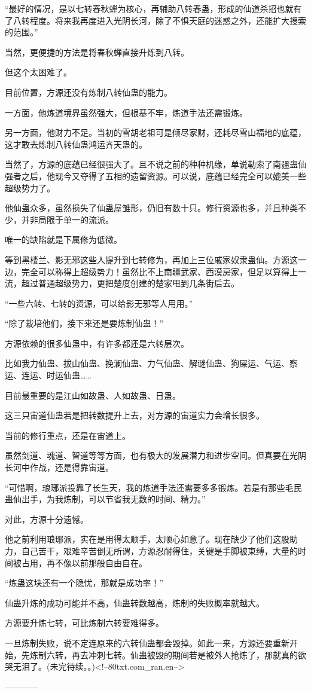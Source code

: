 \begin{this_body}
“最好的情况，是以七转春秋蝉为核心，再辅助八转春蛊，形成的仙道杀招也就有了八转程度。将来我再度进入光阴长河，除了不惧天庭的迷惑之外，还能扩大搜索的范围。”

当然，更便捷的方法是将春秋蝉直接升炼到八转。

但这个太困难了。

目前位置，方源还没有炼制八转仙蛊的能力。

一方面，他炼道境界虽然强大，但根基不牢，炼道手法还需锻炼。

另一方面，他财力不足。当初的雪胡老祖可是倾尽家财，还耗尽雪山福地的底蕴，这才敢去炼制八转仙蛊鸿运齐天蛊的。

当然了，方源的底蕴已经很强大了。且不说之前的种种机缘，单说勒索了南疆蛊仙强者之后，他现今又夺得了五相的遗留资源。可以说，底蕴已经完全可以媲美一些超级势力了。

他仙蛊众多，虽然损失了仙蛊屋雏形，仍旧有数十只。修行资源也多，并且种类不少，并非局限于单一的流派。

唯一的缺陷就是下属修为低微。

等到黑楼兰、影无邪这些人提升到七转修为，再加上三位戚家奴隶蛊仙。方源这一边，完全可以称得上超级势力！虽然比不上南疆武家、西漠房家，但足以算得上一流，超过普通超级势力，更把楚度创建的楚家甩到几条街后去。

“一些六转、七转的资源，可以给影无邪等人用用。”

“除了栽培他们，接下来还是要炼制仙蛊！”

方源依赖的很多仙蛊中，有许多都还是六转层次。

比如我力仙蛊、拔山仙蛊、挽澜仙蛊、力气仙蛊、解谜仙蛊、狗屎运、气运、察运、连运、时运仙蛊……

目前最重要的是江山如故蛊、人如故蛊、日蛊。

这三只宙道仙蛊若是把转数提升上去，对方源的宙道实力会增长很多。

当前的修行重点，还是在宙道上。

虽然剑道、魂道、智道等等方面，也有极大的发展潜力和进步空间。但真要在光阴长河中作战，还是得靠宙道。

“可惜啊，琅琊派投靠了长生天，我的炼道手法还需要多多锻炼。若是有那些毛民蛊仙出手，为我炼制，可以节省我无数的时间、精力。”

对此，方源十分遗憾。

他之前利用琅琊派，实在是用得太顺手，太顺心如意了。现在缺少了他们这股助力，自己苦干，艰难辛苦倒无所谓，方源忍耐得住，关键是手脚被束缚，大量的时间被占用，再不像以前那般自由自在。

“炼蛊这块还有一个隐忧，那就是成功率！”

仙蛊升炼的成功可能并不高，仙蛊转数越高，炼制的失败概率就越大。

方源要升炼七转，可比炼制六转要难得多。

一旦炼制失败，说不定连原来的六转仙蛊都会毁掉。如此一来，方源还要重新开始，先炼制六转，再去冲刺七转。仙蛊被毁的期间若是被外人抢炼了，那就真的欲哭无泪了。(未完待续。。)<!--80txt.com\_ran.en-->

------------

\end{this_body}


